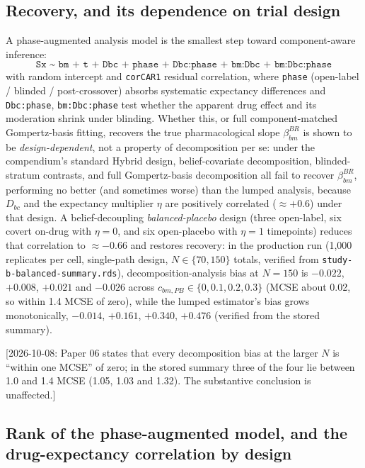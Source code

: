 \documentclass[11pt]{article}
\newcommand{\note}[1]{\textcolor{blue!60!black}{\small [#1]}}
\newcommand{\code}[1]{\texttt{#1}}
\begin{document}
\subsection{Recovery, and its dependence on trial design}

A phase-augmented analysis model is the smallest step toward
component-aware inference:
\begin{equation}
\code{Sx \textasciitilde\ bm + t + Dbc + phase + Dbc:phase + bm:Dbc +
  bm:Dbc:phase}
\label{eq:phase-augmented}
\end{equation}
with random intercept and \code{corCAR1} residual correlation, where
\code{phase} (open-label / blinded / post-crossover) absorbs
systematic expectancy differences and \code{Dbc:phase},
\code{bm:Dbc:phase} test whether the apparent drug effect and its
moderation shrink under blinding. Whether this, or full
component-matched Gompertz-basis fitting, recovers the true
pharmacological slope $\beta_{bm}^{BR}$ is shown to be
\emph{design-dependent}, not a property of decomposition per se: under
the compendium's standard Hybrid design, belief-covariate
decomposition, blinded-stratum contrasts, and full Gompertz-basis
decomposition all fail to recover $\beta_{bm}^{BR}$, performing no
better (and sometimes worse) than the lumped analysis, because
$D_{bc}$ and the expectancy multiplier $\eta$ are positively
correlated ($\approx+0.6$) under that design. A belief-decoupling
\emph{balanced-placebo} design (three open-label, six covert on-drug
with $\eta=0$, and six open-placebo with $\eta=1$ timepoints) reduces
that correlation to $\approx-0.66$ and restores recovery: in the
production run (1{,}000 replicates per cell, single-path design, $N
\in \{70, 150\}$ totals, verified from
\code{study-b-balanced-summary.rds}), decomposition-analysis bias at
$N = 150$ is $-0.022$, $+0.008$, $+0.021$ and $-0.026$ across
$c_{bm,PB}\in\{0,0.1,0.2,0.3\}$ (MCSE about 0.02, so within 1.4 MCSE
of zero), while the lumped estimator's bias grows monotonically,
$-0.014$, $+0.161$, $+0.340$, $+0.476$ (verified from the stored
summary).

\note{2026-10-08: Paper 06 states that every decomposition bias at the
larger $N$ is ``within one MCSE'' of zero; in the stored summary three
of the four lie between 1.0 and 1.4 MCSE (1.05, 1.03 and 1.32). The substantive conclusion is
unaffected.}

\subsection{Rank of the phase-augmented model, and the drug-expectancy
correlation by design}
\label{sec:invb-collinearity}
\end{document}

